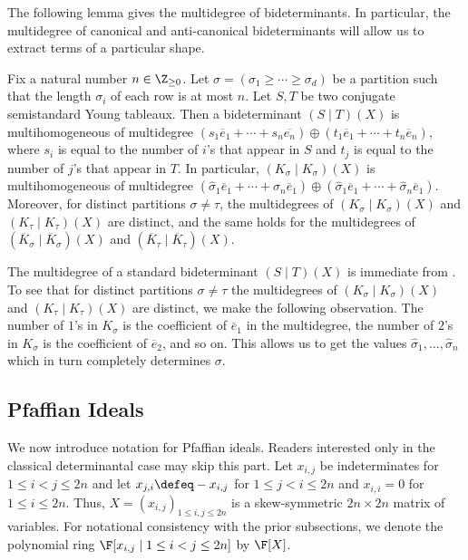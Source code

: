 \documentclass[letterpaper, 11pt]{amsart}
\begin{document}
The following lemma gives the multidegree of bideterminants.
In particular, the multidegree of canonical and anti-canonical bideterminants will allow us to extract terms of a particular shape.
\begin{lem}\label{lem:canonical_degs}
    Fix a natural number $n \in \Z_{\geq 0}$.
    Let $\sigma = (\sigma_1 \geq \cdots \geq \sigma_d)$ be a partition such that the length $\sigma_i$ of each row is at most $n$.
    Let $S, T$ be two conjugate semistandard Young tableaux.
    Then a bideterminant $(S \mid T)(X)$ is multihomogeneous of multidegree $(s_1 \overline{e}_1 + \cdots + s_n \overline{e_n}) \oplus (t_1 \overline{e}_1 + \cdots + t_n \overline{e}_n)$, where $s_i$ is equal to the number of $i$'s that appear in $S$ and $t_j$ is equal to the number of $j$'s that appear in $T$.
    In particular, $(K_\sigma \mid K_\sigma)(X)$ is multihomogeneous of multidegree $(\widehat{\sigma}_1 \overline{e}_1 + \cdots + \widehat{\sigma}_n \overline{e}_1) \oplus (\widehat{\sigma}_1 \overline{e}_1 + \cdots + \widehat{\sigma}_n \overline{e}_1)$.
    Moreover, for distinct partitions $\sigma \neq \tau$, the multidegrees of $(K_\sigma \mid K_\sigma)(X)$ and $(K_\tau \mid K_\tau)(X)$ are distinct, and the same holds for the multidegrees of $(\overline{K}_\sigma \mid \overline{K}_\sigma)(X)$ and $(\overline{K}_\tau \mid \overline{K}_\tau)(X)$. 
\end{lem}
\begin{pf}
    The multidegree of a standard bideterminant $(S \mid T)(X)$ is immediate from .
    To see that for distinct partitions $\sigma \neq \tau$ the multidegrees of $(K_\sigma \mid K_\sigma)(X)$ and $(K_\tau \mid K_\tau)(X)$ are distinct, we make the following observation.
    The number of $1$'s in $K_{\sigma}$ is the coefficient of $\overline{e}_1$ in the multidegree, the number of $2$'s in $K_{\sigma}$ is the coefficient of $\overline{e}_2$, and so on.
    This allows us to get the values $\widehat{\sigma}_1, \ldots, \widehat{\sigma}_n$ which in turn completely determines $\sigma$.
\end{pf}

\subsection{Pfaffian Ideals} 

We now introduce notation for Pfaffian ideals.
Readers interested only in the classical determinantal case may skip this part.
Let $x_{i, j}$ be indeterminates for $1 \leq i < j \leq 2n$ and let $x_{j, i} \defeq -x_{i, j}$ for $1 \leq j < i \leq 2n$ and $x_{i, i} = 0$ for $1 \leq i \leq 2n$.
Thus, $X = (x_{i, j})_{1 \leq i, j \leq 2n}$ is a skew-symmetric $2n \times 2n$ matrix of variables.
For notational consistency with the prior subsections, we denote the polynomial ring $\F[x_{i, j} \mid 1 \leq i < j \leq 2n]$ by $\F[X]$.
\end{document}
